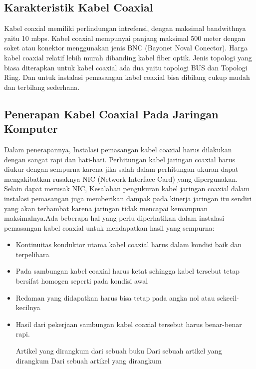 	\subsection {Karakteristik Kabel Coaxial}
	Kabel coaxial memiliki perlindungan intrefensi, dengan maksimal bandwithnya yaitu 10 mbps. Kabel coaxial mempunyai panjang maksimal 500 meter dengan soket atau konektor menggunakan jenis BNC (Bayonet Noval Conector). Harga kabel coaxial relatif lebih murah dibanding kabel fiber optik. Jenis topologi yang biasa diterapkan untuk kabel coaxial ada dua yaitu topologi BUS dan Topologi Ring. Dan untuk instalasi pemasangan kabel coaxial bisa dibilang cukup mudah dan terbilang sederhana.
	
	\subsection {Penerapan Kabel Coaxial Pada Jaringan Komputer}
	Dalam penerapannya, Instalasi pemasangan kabel coaxial harus dilakukan dengan sangat rapi dan hati-hati. Perhitungan kabel jaringan coaxial harus diukur dengan sempurna karena jika salah dalam perhitungan ukuran dapat mengakibatkan rusaknya NIC (Network Interface Card) yang dipergunakan. Selain dapat merusak NIC, Kesalahan pengukuran kabel jaringan coaxial dalam instalasi pemasangan juga memberikan dampak pada kinerja jaringan itu sendiri yang akan terhambat karena jaringan tidak mencapai kemampuan maksimalnya.Ada beberapa hal yang perlu diperhatikan dalam instalasi pemasangan kabel coaxial untuk mendapatkan hasil yang sempurna:
		\begin{itemize}
			\item Kontinuitas konduktor utama kabel coaxial harus dalam kondisi baik dan terpelihara
			\item Pada sambungan kabel coaxial harus ketat sehingga kabel tersebut tetap bersifat homogen seperti pada kondisi awal
			\item Redaman yang didapatkan harus bisa tetap pada angka nol atau sekecil-kecilnya
			\item Hasil dari pekerjaan sambungan kabel coaxial tersebut harus benar-benar rapi.
	

	
Artikel yang dirangkum dari sebuah buku \cite{syafrizal2005pengantar}
Dari sebuah artikel yang dirangkum \cite{kelik2003pengantar}
Dari sebuah artikel yang dirangkum \cite{beveridge1995method}
\end{itemize}
